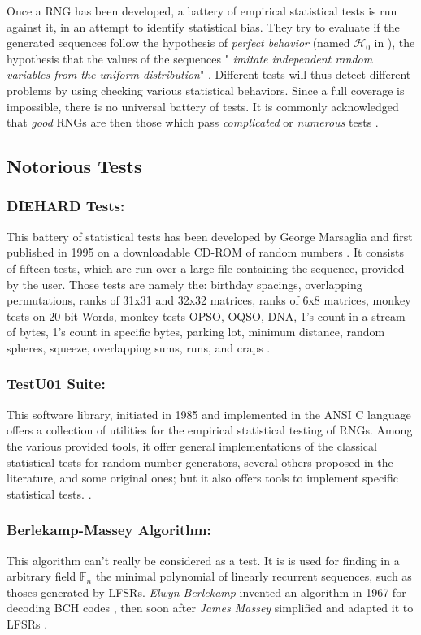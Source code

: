 \documentclass{llncs}
\begin{document}
Once a RNG has been developed, a battery of empirical statistical tests is run against it, in an attempt to identify statistical bias. They try to evaluate if the generated sequences follow the hypothesis of \emph{perfect behavior} (named $\mathcal{H}_0$ in \cite{lecu}), the hypothesis that the values of the sequences "\textit{ imitate independent random variables from the uniform distribution}" \cite{lecu}. Different tests will thus detect different problems by using checking various statistical behaviors. Since a full coverage is impossible, there is no universal battery of tests. It is commonly acknowledged that \textit{good} RNGs are then those which pass \textit{complicated} or \textit{numerous} tests \cite{ritt,lecu}. 


\subsection{Notorious Tests}


\subsubsection{DIEHARD Tests:} 

This battery of statistical tests has been developed by George Marsaglia and first published in 1995 on a downloadable CD-ROM of random numbers \cite{marsa}. It consists of fifteen tests, which are run over a large file containing the sequence, provided by the user. Those tests are namely the: birthday spacings, overlapping permutations, ranks of 31x31 and 32x32 matrices, ranks of 6x8 matrices, monkey tests on 20-bit Words, monkey tests OPSO, OQSO, DNA, 1's count in a stream of bytes, 1's count in specific bytes, parking lot, minimum distance, random spheres, squeeze, overlapping sums, runs, and craps \cite{soto}.

\subsubsection{TestU01 Suite:}
This software library, initiated in 1985 and implemented in the ANSI C language offers a collection of utilities for the empirical statistical testing of RNGs. Among the various provided tools, it offer general implementations of the classical statistical tests for random number generators, several others proposed in the literature, and some original ones; but it also offers tools to implement specific statistical tests. \cite{lecu}.

\subsubsection{Berlekamp-Massey Algorithm:} This algorithm can't really be considered as a test. It is is used for finding in a arbitrary field $\mathbb{F}_n$ the minimal polynomial of linearly recurrent sequences, such as thoses generated by LFSRs. \emph{Elwyn Berlekamp} invented an algorithm in 1967 for decoding BCH codes \cite{berle}, then soon after \emph{James Massey} simplified and adapted it to LFSRs \cite{mass}.
\end{document}
